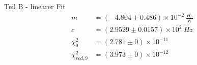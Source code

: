 {\LARGE Teil B - linearer Fit}
\begin{align*}
	m &= \left(-4.804 \pm 0.486\right) \times 10^{-2}\ \frac{Hz}{K}\\
	c &= \left(2.9529 \pm 0.0157\right) \times 10^{2}\ Hz\\
	\chi^2_{9} &= \left(2.781 \pm 0\right) \times 10^{-11}\ \\
	\chi^2_{red,9} &= \left(3.973 \pm 0\right) \times 10^{-12}\ \\
\end{align*}